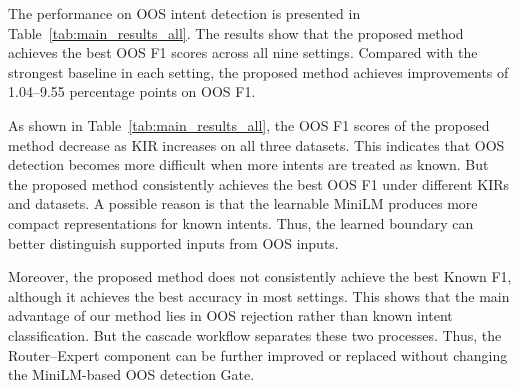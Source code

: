 \documentclass[11pt]{article}
\begin{document}
The performance on OOS intent detection is presented in Table~\ref{tab:main_results_all}. The results show that the proposed method achieves the best OOS F1 scores across all nine settings. Compared with the strongest baseline in each setting, the proposed method achieves improvements of 1.04--9.55 percentage points on OOS F1.

As shown in Table~\ref{tab:main_results_all}, the OOS F1 scores of the proposed method decrease as KIR increases on all three datasets. This indicates that OOS detection becomes more difficult when more intents are treated as known. But the proposed method consistently achieves the best OOS F1 under different KIRs and datasets. A possible reason is that the learnable MiniLM produces more compact representations for known intents. Thus, the learned boundary can better distinguish supported inputs from OOS inputs.

Moreover, the proposed method does not consistently achieve the best Known F1, although it achieves the best accuracy in most settings. This shows that the main advantage of our method lies in OOS rejection rather than known intent classification. But the cascade workflow separates these two processes. Thus, the Router--Expert component can be further improved or replaced without changing the MiniLM-based OOS detection Gate.
\end{document}

